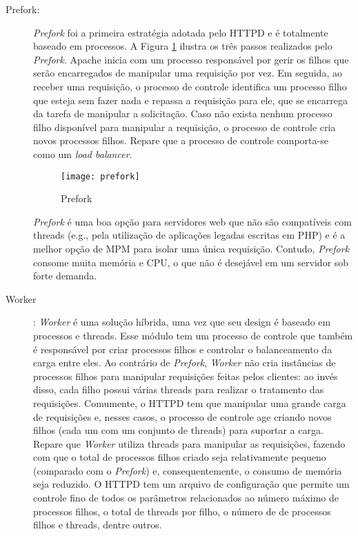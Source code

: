 \begin{description}

	\item[Prefork:]

\textit{Prefork} foi a primeira estratégia adotada pelo HTTPD e é totalmente
baseado em processos. A Figura \ref{fig:prefork} ilustra os três passos
realizados pelo \textit{Prefork}. Apache inicia com um processo responsável
por gerir os filhos que serão encarregados de manipular uma requisição por vez.
Em seguida, ao receber uma requisição, o processo de controle identifica um
processo filho que esteja sem fazer nada e repassa a requisição para ele, que
se encarrega da tarefa de manipular a solicitação. Caso não exista nenhum
processo filho disponível para manipular a requisição, o processo de
controle cria novos processos filhos. Repare que a processo de controle
comporta-se como um \textit{load balancer}.

\begin{figure}[!h]
  \centering
  \texttt{[image: prefork]} 
  \caption{Prefork}
  \label{fig:prefork} 
\end{figure}

\textit{Prefork} é uma boa opção para servidores web que não são compatíveis
com threads (e.g., pela utilização de aplicações legadas escritas em PHP) e é a melhor opção de MPM
para isolar uma única requisição. Contudo, \textit{Prefork} consome muita
memória e CPU, o que não é desejável em um servidor sob forte demanda.

	\item [Worker]: \textit{Worker} é uma solução híbrida, uma vez que seu design é baseado em
processos e threads. Esse módulo tem um processo de controle que também é responsável
por criar processos filhos e controlar o balanceamento da carga entre eles.
Ao contrário de \textit{Prefork}, \textit{Worker} não cria instâncias
de processos filhos para manipular requisições feitas pelos clientes: ao
invés disso, cada filho possui várias threads para realizar
o tratamento das requisições. Comumente, o HTTPD tem que manipular uma
grande carga de requisições e, nesses casos, o processo de controle age criando
novos filhos (cada um com um conjunto de threads) para suportar a carga.
Repare que \textit{Worker} utiliza threads para manipular as requisições,
fazendo com que o total de processos filhos criado seja relativamente pequeno
(comparado com o \textit{Prefork}) e, consequentemente, o consumo de memória
seja reduzido. O HTTPD tem um arquivo de configuração que permite um controle fino de
todos os parâmetros relacionados ao número máximo de processos filhos, o total
de threads por filho, o número de  de processos filhos e threads,
dentre outros.


\end{description}

